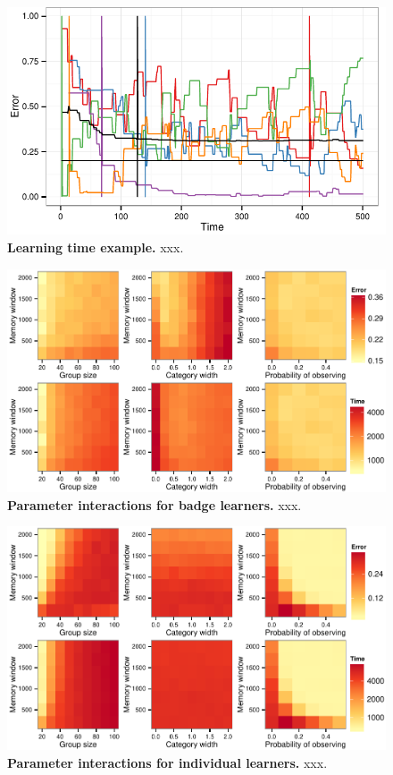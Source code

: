 \begin{figure}[h]
\caption{\sffamily\small\textbf{Learning time example.}
     xxx.}
\label{learnT.ex}
\includegraphics[width=.8\textwidth]{figures/learning_time_example.pdf}
\end{figure}

\begin{figure}[h]
\caption{\sffamily\small\textbf{Parameter interactions for badge learners.}
     xxx.}
\label{learnT.ex}
\includegraphics[width=.8\textwidth]{figures/parameter_interactions_badge.pdf}
\end{figure}

\begin{figure}[h]
\caption{\sffamily\small\textbf{Parameter interactions for individual learners.}
     xxx.}
\label{learnT.ex}
\includegraphics[width=.8\textwidth]{figures/parameter_interactions_indiv.pdf}
\end{figure}


